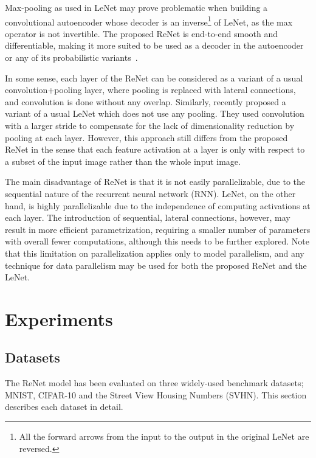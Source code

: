 Max-pooling as used in LeNet may prove problematic when building a
convolutional autoencoder whose decoder is an inverse\footnote{
    All the forward arrows from the input to the output in the original LeNet
    are reversed.
}
of LeNet, as the max operator is not invertible. The proposed
ReNet is end-to-end smooth and differentiable, making it more suited to be used
as a decoder in the autoencoder or any of its probabilistic variants~\citep[see,
e.g.,][]{Kingma+Welling-ICLR2014}.

In some sense, each layer of the ReNet can be considered as a variant of a usual
convolution+pooling layer, where pooling is replaced with lateral connections,
and convolution is done without any overlap. Similarly, \citet{Springenberg2014}
recently proposed a variant of a usual LeNet which does not use any pooling.
They used convolution with a larger stride to compensate for the lack of
dimensionality reduction by pooling at each layer. However, this approach still
differs from the proposed ReNet in the sense that each feature activation at a
layer is only with respect to a subset of the input image rather than the whole
input image.

The main disadvantage of ReNet is that it is not easily parallelizable, due to
the sequential nature of the recurrent neural network (RNN). LeNet, on the other
hand, is highly parallelizable due to the independence of computing activations
at each layer. The introduction of sequential, lateral connections, however, may
result in more efficient parametrization, requiring a smaller number of
parameters with overall fewer computations, although this needs to be further
explored. Note that this limitation on parallelization applies only to model
parallelism, and any technique for data parallelism may be used for both the
proposed ReNet and the LeNet.

\section{Experiments}\label{sec:renet_experiments}

\subsection{Datasets}

The ReNet model has been evaluated on three widely-used benchmark datasets;
MNIST, CIFAR-10 and the Street View Housing Numbers (SVHN). This section
describes each dataset in detail.

